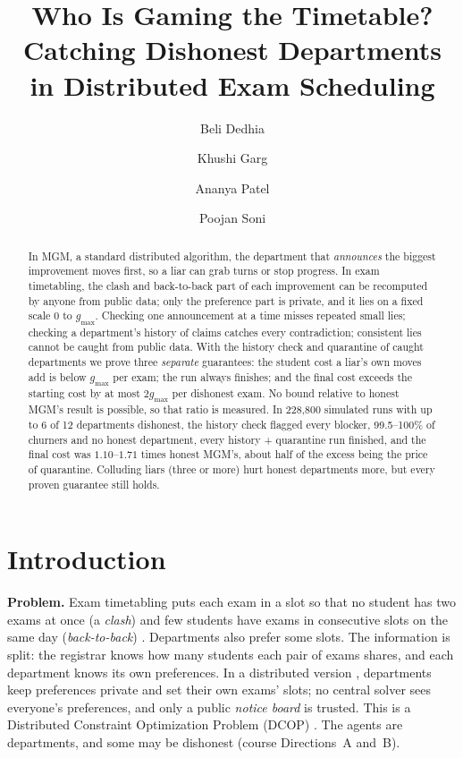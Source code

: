 \documentclass{article}
\title{Who Is Gaming the Timetable? Catching Dishonest Departments\\ in Distributed Exam Scheduling}
\date{}
\author{Beli Dedhia}
\author{Khushi Garg}
\author{Ananya Patel}
\author{Poojan Soni}
\affil{Indian Institute of Technology Gandhinagar\\ \normalfont\small Code and data: \url{https://github.com/beli-246/DCOP-Project}}
\theoremstyle{definition}
\newcommand{\1}{\mathbf{1}}
\newcommand{\gmax}{g_{\max}}
\begin{document}
\maketitle
\vspace{-2.2em}
\begin{abstract}
In MGM, a standard distributed algorithm, the department that \emph{announces} the biggest improvement moves first, so a liar can grab turns or stop progress. In exam timetabling, the clash and back-to-back part of each improvement can be recomputed by anyone from public data; only the preference part is private, and it lies on a fixed scale $0$ to $\gmax$. Checking one announcement at a time misses repeated small lies; checking a department's history of claims catches every contradiction; consistent lies cannot be caught from public data. With the history check and quarantine of caught departments we prove three \emph{separate} guarantees: the student cost a liar's own moves add is below $\gmax$ per exam; the run always finishes; and the final cost exceeds the starting cost by at most $2\gmax$ per dishonest exam. No bound relative to honest MGM's result is possible, so that ratio is measured. In 228{,}800 simulated runs with up to 6 of 12 departments dishonest, the history check flagged every blocker, 99.5--100\% of churners and no honest department, every history + quarantine run finished, and the final cost was $1.10$--$1.71$ times honest MGM's, about half of the excess being the price of quarantine. Colluding liars (three or more) hurt honest departments more, but every proven guarantee still holds.
\end{abstract}

\section{Introduction}
\textbf{Problem.} Exam timetabling puts each exam in a slot so that no student has two exams at once (a \emph{clash}) and few students have exams in consecutive slots on the same day (\emph{back-to-back}) \citep{carter1996}. Departments also prefer some slots. The information is split: the registrar knows how many students each pair of exams shares, and each department knows its own preferences. In a distributed version \citep{meisels2003}, departments keep preferences private and set their own exams' slots; no central solver sees everyone's preferences, and only a public \emph{notice board} is trusted. This is a Distributed Constraint Optimization Problem (DCOP) \citep{yokoo1998,fioretto2018}. The agents are departments, and some may be dishonest (course Directions~A and~B).
\end{document}
